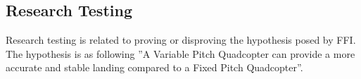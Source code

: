 \subsection{Research Testing}
Research testing is related to proving or disproving the hypothesis posed by FFI.
The hypothesis is as following ”A Variable Pitch Quadcopter can provide a more accurate and stable landing compared to a Fixed Pitch Quadcopter”. \\
\\

\begin{comment}
Given that a stable FPQ and VPQ is developed, these objectives may be tested:
\begin {table}[H]
    \begin{tabular}{|l|l|}\hline 
        \textbf{Objective:} & \textbf{Suggested Test:}\\
        \hline 
        Differences in landing accuracy & Multiple landing experiments on fixed spot\\ \hline
        Differences in landing stability & Multiple landing experiments on fixed spot\\
        &   Qualisys \\\hline
        Differences in flight with turbulent environment & Multiple flight experiments with disturbances\\ \hline
        Differences in response time regarding thrust & Loop 800 \\
        change & \\
        \hline 
    \end{tabular}
\end{table}
\noindent
Given that no stable FPQ and VPQ is developed, these objectives may be tested:
\begin {table}[H]
    \begin{tabular}{|l|l|}\hline 
        \textbf{Objective} & \textbf{Suggested Test}\\
        \hline 
        Differences in response time regarding thrust &  Test Rig with loop script\\
        change between FPM and VPM &      \\\hline
        Differences in efficiency between FPM and & Test Rig with weight and external power supply\\
        VPM (g/W) & \\
        \hline 
    \end{tabular}
\end{table}


\end{comment}
